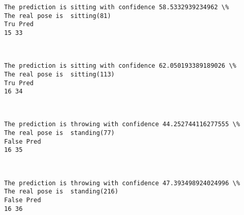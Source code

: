 \documentclass[11pt]{article}
\begin{document}
    \begin{Verbatim}[commandchars=\\\{\}]
The prediction is sitting with confidence 58.5332939234962 \%
The real pose is  sitting(81)
Tru Pred
15 33

    \end{Verbatim}

    \begin{center}
    \end{center}
    { \hspace*{\fill} \\}
    
    \begin{Verbatim}[commandchars=\\\{\}]
The prediction is sitting with confidence 62.050193389189026 \%
The real pose is  sitting(113)
Tru Pred
16 34

    \end{Verbatim}

    \begin{center}
    \end{center}
    { \hspace*{\fill} \\}
    
    \begin{Verbatim}[commandchars=\\\{\}]
The prediction is throwing with confidence 44.252744116277555 \%
The real pose is  standing(77)
False Pred
16 35

    \end{Verbatim}

    \begin{center}
    \end{center}
    { \hspace*{\fill} \\}
    
    \begin{Verbatim}[commandchars=\\\{\}]
The prediction is throwing with confidence 47.393498924024996 \%
The real pose is  standing(216)
False Pred
16 36

    \end{Verbatim}

    \begin{center}
    \end{center}
    { \hspace*{\fill} \\}
    
\end{document}

